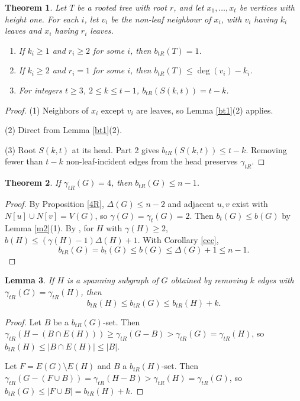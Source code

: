 \documentclass[12pt,reqno]{amsart}
\theoremstyle{plain}
\newtheorem{theorem}{Theorem}
\newtheorem{lemma}[theorem]{Lemma}
\numberwithin{equation}{section}
\begin{document}
\begin{theorem}
Let $T$ be a rooted tree with root $r$, and let $x_1, \dots, x_t$ be vertices with height one. For each $i$, let $v_i$ be the non-leaf neighbour of $x_i$, with $v_i$ having $k_i$ leaves and $x_i$ having $r_i$ leaves.
\begin{enumerate}
\item If $k_i \geq 1$ and $r_i \geq 2$ for some $i$, then $b_{tR}(T) = 1$.
\item If $k_i \geq 2$ and $r_i = 1$ for some $i$, then $b_{tR}(T) \leq \deg(v_i) - k_i$.
\item For integers $t \geq 3$, $2 \leq k \leq t-1$, $b_{tR}(S(k,t)) = t - k$.
\end{enumerate}
\end{theorem}
\begin{proof}
(1) Neighbors of $x_i$ except $v_i$ are leaves, so Lemma \ref{bt1}(2) applies.

(2) Direct from Lemma \ref{bt1}(2).

(3) Root $S(k,t)$ at its head. Part 2 gives $b_{tR}(S(k,t))\leq t - k$. Removing fewer than $t - k$ non-leaf-incident edges from the head preserves $\gamma_{tR}$.
\end{proof}

\begin{theorem}\label{3}
If $\gamma _{tR}(G)=4$, then $b_{tR}(G)\leq n-1$.
\end{theorem}
\begin{proof}
By Proposition \ref{4R}, $\Delta(G) \leq n-2$ and adjacent $u,v$ exist with $N[u] \cup N[v] = V(G)$, so $\gamma(G) = \gamma_t(G) = 2$. Then $b_t(G) \leq b(G)$ by Lemma \ref{m2}(1). By \cite[Theorem 7]{refrefref}, for $H$ with $\gamma(H) \geq 2$, $b(H) \leq (\gamma(H) - 1)\Delta(H) + 1$. With Corollary \ref{ccc},
$$b_{tR}(G) = b_t(G) \leq b(G) \leq \Delta(G) + 1 \leq n - 1.$$
\end{proof}

\begin{lemma}\label{sub}
If $H$ is a spanning subgraph of $G$ obtained by removing $k$ edges with $\gamma_{tR}(G) = \gamma_{tR}(H)$, then
$$b_{tR}(H) \leq b_{tR}(G) \leq b_{tR}(H) + k.$$
\end{lemma}
\begin{proof}
Let $B$ be a $b_{tR}(G)$-set. Then $\gamma_{tR}(H - (B\cap E(H))) \geq \gamma_{tR}(G - B) > \gamma_{tR}(G) = \gamma_{tR}(H)$, so $b_{tR}(H) \leq |B\cap E(H)| \leq |B|$.

Let $F = E(G) \setminus E(H)$ and $B$ a $b_{tR}(H)$-set. Then $\gamma_{tR}(G - (F \cup B)) = \gamma_{tR}(H - B) > \gamma_{tR}(H) = \gamma_{tR}(G)$, so $b_{tR}(G) \leq |F \cup B| = b_{tR}(H) + k$.
\end{proof}
\end{document}
